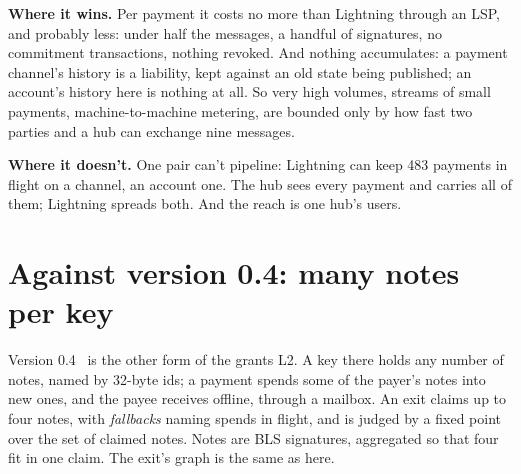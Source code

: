 \documentclass[11pt]{article}
\theoremstyle{plain}
\theoremstyle{definition}
\begin{document}
\textbf{Where it wins.} Per payment it costs no more than Lightning
through an LSP, and probably less: under half the messages, a handful of
signatures, no commitment transactions, nothing revoked. And nothing
accumulates: a payment channel's history is a liability, kept against an
old state being published; an account's history here is nothing at all.
So very high volumes, streams of small payments, machine-to-machine
metering, are bounded only by how fast two parties and a hub can
exchange nine messages.

\textbf{Where it doesn't.} One pair can't pipeline: Lightning can keep
483 payments in flight on a channel, an account one. The hub sees every
payment and carries all of them; Lightning spreads both. And the reach
is one hub's users.

\section{Against version 0.4: many notes per key}\label{sec:compare}

Version 0.4~\cite{grants04} is the other form of the grants L2. A key
there holds any number of notes, named by 32-byte ids; a payment spends
some of the payer's notes into new ones, and the payee receives offline,
through a mailbox. An exit claims up to four notes, with \emph{fallbacks}
naming spends in flight, and is judged by a fixed point over the set of
claimed notes. Notes are BLS signatures, aggregated so that four fit in
one claim. The exit's graph is the same as here.
\end{document}
